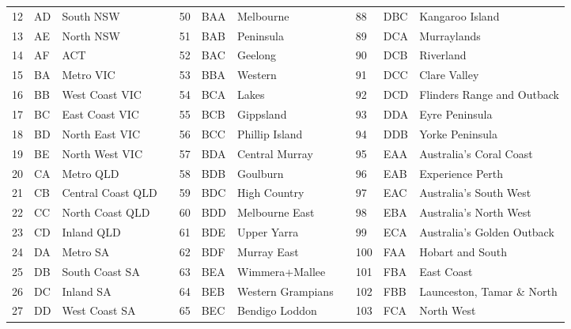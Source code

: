 \documentclass[12pt]{article}
\theoremstyle{definition}
\begin{document}
\begin{table}[!hb]
{\begin{tabular}{lllllllllll}
			12	& AD & South NSW 			&  & 50  & BAA & Melbourne &&88  & DBC & Kangaroo Island\\
			13	& AE & North NSW 			&  & 51  & BAB & Peninsula    &&89  & DCA & Murraylands\\
			14	& AF & ACT					&  &  52  & BAC & Geelong  && 90  & DCB & Riverland\\
			15	& BA & Metro VIC			&  &  53  & BBA & Western   &&91  & DCC & Clare Valley\\
			16	& BB & West Coast VIC		&  &  54  & BCA & Lakes  &&92  & DCD & Flinders Range and Outback\\
			17	& BC & East Coast VIC		&  &  55  & BCB & Gippsland    &&93  & DDA & Eyre Peninsula\\
			18	& BD & North East VIC		&  &  56  & BCC & Phillip Island   &&  94  & DDB & Yorke Peninsula \\
			19	& BE & North West VIC		&  &  57  & BDA & Central Murray    &&95  & EAA & Australia's Coral Coast\\
			20  & CA & Metro QLD			&  & 58  & BDB & Goulburn    &&96  & EAB & Experience Perth\\
			21  & CB & Central Coast QLD	&  & 59  & BDC & High Country   &&97  & EAC & Australia's South West\\
			22  & CC & North Coast QLD		&  &  60  & BDD & Melbourne East &&98  & EBA & Australia's North West \\
			23  & CD & Inland QLD			&  &   61  & BDE & Upper Yarra &&99  & ECA & Australia's Golden Outback\\
			24	& DA & Metro SA				&  & 62  & BDF & Murray East  && 100 & FAA & Hobart and South\\
			25	& DB & South Coast SA		&  &  63  & BEA & Wimmera+Mallee &&101 & FBA & East Coast\\
			26	& DC & Inland SA			&  & 64  & BEB & Western Grampians &&102 & FBB & Launceston, Tamar \& North\\
			27	& DD & West Coast SA		&  &65  & BEC & Bendigo Loddon  &&103 & FCA & North West\\
			

\end{tabular}}
\end{table}
\end{document}
